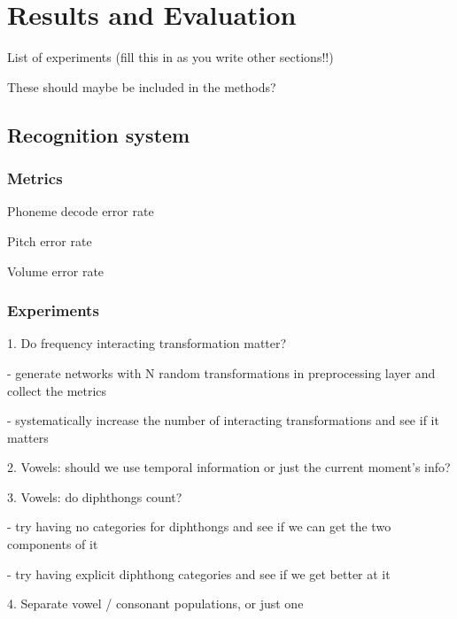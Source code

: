 \chapter{Results and Evaluation}



List of experiments (fill this in as you write other sections!!)

These should maybe be included in the methods?

\section{Recognition system}

\subsection{Metrics}

Phoneme decode error rate

Pitch error rate

Volume error rate

\subsection{Experiments}

1. Do frequency interacting transformation matter?

- generate networks with N random transformations
  in preprocessing layer and collect the metrics

- systematically increase the number of interacting
  transformations and see if it matters

2. Vowels: should we use temporal information or just
   the current moment's info?

3. Vowels: do diphthongs count?

- try having no categories for diphthongs and see if
  we can get the two components of it

- try having explicit diphthong categories and see
  if we get better at it

4. Separate vowel / consonant populations, or just one

